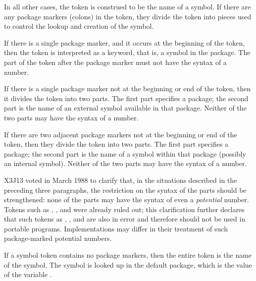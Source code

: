 In all other cases, the token is construed to be the name of a symbol.
If there are any package markers
(colons) in the token, they divide the token into pieces used to
control the lookup and creation of the symbol.

\begin{obsolete}
If there is a single package marker, and it occurs at the beginning of the
token, then the token is interpreted as a keyword, that is, a symbol in the
 package.  The part of the token after the package marker must
not have the syntax of a number.

If there is a single package marker not at the beginning or end of the
token, then it divides the token into two parts.  The first part
specifies a package; the second part is the name of an external symbol
available in that package.  Neither of the two parts may have the syntax
of a number.

If there are two adjacent package markers not at the beginning or end of the
token, then they divide the token into two parts.  The first part
specifies a package; the second part is the name of a symbol within
that package (possibly an internal symbol).
Neither of the two parts may have the syntax of a number.
\end{obsolete}

\begin{new}
X3J13 voted in March 1988
to clarify that, in the situations described in the
preceding three paragraphs, the restriction on the syntax of the parts should
be strengthened:  none of the parts may have the syntax of even
a {\it potential} number.  Tokens such as , ,
and  were already ruled out; this clarification further
declares that such tokens as , ,
and  are also in error and therefore should not be used
in portable programs.  Implementations may differ in their treatment of
such package-marked potential numbers.
\end{new}

If a symbol token contains no package markers, then the entire token
is the name of the symbol.  The symbol is looked up in
the default package, which is the value
of the variable .

